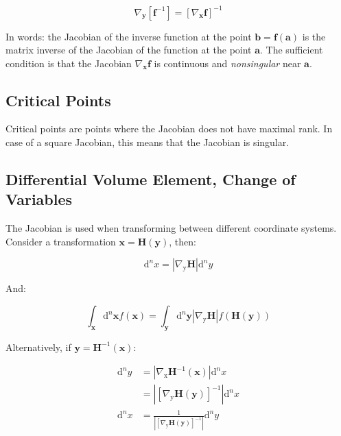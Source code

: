 \begin{equation}
\nabla_\mathbf{y}\left[\mathbf{f}^{-1}\right] = \left[\nabla_\mathbf{x} \mathbf{f} \right]^{-1}
\end{equation}

In words: the Jacobian of the inverse function at the point $\mathbf{b} = \mathbf{f}(\mathbf{a})$ is the matrix inverse of the Jacobian of the function at the point $\mathbf{a}$. The sufficient condition is that the Jacobian $\nabla_\mathbf{x}\mathbf{f}$ is continuous and \textit{nonsingular} near $\mathbf{a}$.

\subsection{Critical Points}
Critical points are points where the Jacobian does not have maximal rank. In case of a square Jacobian, this means that the Jacobian is singular. 

\subsection{Differential Volume Element, Change of Variables}
The Jacobian is used when transforming between different coordinate systems. Consider a transformation $\mathbf{x} = \mathbf{H}(\mathbf{y})$, then:

\begin{equation}
\mathrm{d}^n x = \left|\nabla_\mathrm{y} \mathbf{H} \right| \mathrm{d}^n y
\end{equation}

And:

\begin{equation}
\int_\mathbf{x} \mathrm{d}^n\mathbf{x} f(\mathbf{x}) = \int_\mathbf{y} \mathrm{d}^n\mathbf{y} \left|\nabla_\mathrm{y} \mathbf{H} \right| f(\mathbf{H}(\mathbf{y}))
\end{equation}

Alternatively, if $\mathbf{y} = \mathbf{H}^{-1}(\mathbf{x})$:

 \begin{equation}
 \begin{array}{rl}
 \mathrm{d}^n y &= \left|\nabla_\mathrm{x} \mathbf{H}^{-1}(\mathbf{x})\right| \mathrm{d}^n x\\
 &= \left| \left[ \nabla_\mathrm{y} \mathbf{H}(\mathbf{y}) \right]^{-1} \right| \mathrm{d}^n x\\
 \mathrm{d}^n x &= \frac{1}{\left| \left[ \nabla_\mathrm{y} \mathbf{H}(\mathbf{y}) \right]^{-1} \right|}  \mathrm{d}^n y 
 \end{array}
 \end{equation}

